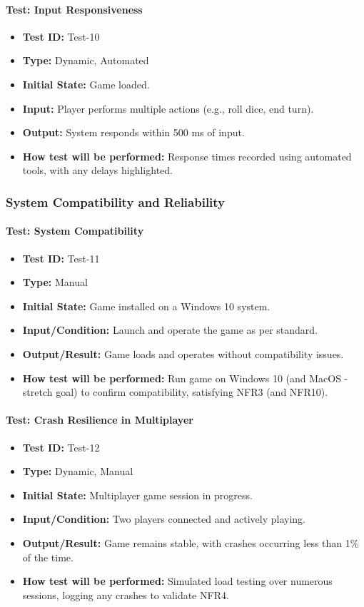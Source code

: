 \documentclass[12pt, titlepage]{article}
\begin{document}
\paragraph{Test: Input Responsiveness}
\begin{itemize}
    \item \textbf{Test ID:} Test-10
    \item \textbf{Type:} Dynamic, Automated
    \item \textbf{Initial State:} Game loaded.
    \item \textbf{Input:} Player performs multiple actions (e.g., roll dice, end turn).
    \item \textbf{Output:} System responds within 500 ms of input.
    \item \textbf{How test will be performed:} Response times recorded using automated tools, with any delays highlighted.
\end{itemize}

\subsubsection{System Compatibility and Reliability}

\paragraph{Test: System Compatibility}
\begin{itemize}
    \item \textbf{Test ID:} Test-11
    \item \textbf{Type:} Manual
    \item \textbf{Initial State:} Game installed on a Windows 10 system.
    \item \textbf{Input/Condition:} Launch and operate the game as per standard.
    \item \textbf{Output/Result:} Game loads and operates without compatibility issues.
    \item \textbf{How test will be performed:} Run game on Windows 10 (and MacOS - stretch goal) to confirm compatibility, satisfying NFR3 (and NFR10).
\end{itemize}

\paragraph{Test: Crash Resilience in Multiplayer}
\begin{itemize}
    \item \textbf{Test ID:} Test-12
    \item \textbf{Type:} Dynamic, Manual
    \item \textbf{Initial State:} Multiplayer game session in progress.
    \item \textbf{Input/Condition:} Two players connected and actively playing.
    \item \textbf{Output/Result:} Game remains stable, with crashes occurring less than 1\% of the time.
    \item \textbf{How test will be performed:} Simulated load testing over numerous sessions, logging any crashes to validate NFR4.
\end{itemize}
\end{document}
